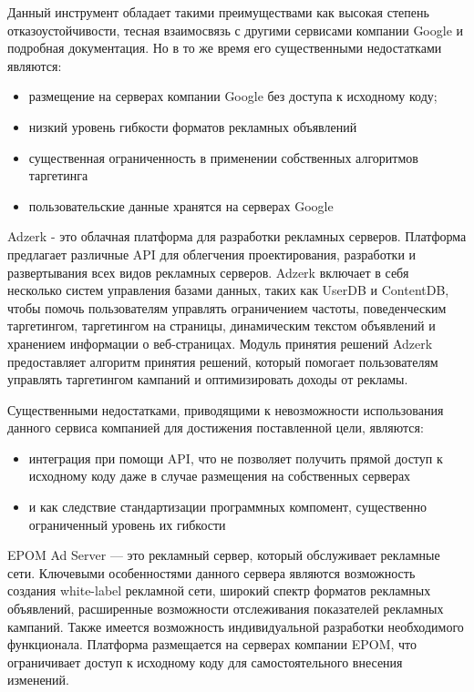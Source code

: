 \documentclass[times]{itmo-student-thesis}
\begin{document}
Данный инструмент обладает такими преимуществами как высокая степень отказоустойчивости, тесная взаимосвязь с другими сервисами компании Google и подробная документация. Но в то же время его существенными недостатками являются:
\begin{itemize}
\item размещение на серверах компании Google без доступа к исходному коду;
\item низкий уровень гибкости форматов рекламных объявлений
\item существенная ограниченность в применении собственных алгоритмов таргетинга
\item пользовательские данные хранятся на серверах Google
\end{itemize}


Adzerk\cite{adzerk} - это облачная платформа для разработки рекламных серверов. Платформа предлагает различные API для облегчения проектирования, разработки и развертывания всех видов рекламных серверов. Adzerk включает в себя несколько систем управления базами данных, таких как UserDB и ContentDB, чтобы помочь пользователям управлять ограничением частоты, поведенческим таргетингом, таргетингом на страницы, динамическим текстом объявлений и хранением информации о веб-страницах. Модуль принятия решений Adzerk предоставляет алгоритм принятия решений, который помогает пользователям управлять таргетингом кампаний и оптимизировать доходы от рекламы. 

Существенными недостатками, приводящими к невозможности использования данного сервиса компанией для достижения поставленной цели, являются:
\begin{itemize}
\item интеграция при помощи API, что не позволяет получить прямой доступ к исходному коду даже в случае размещения на собственных серверах
\item и как следствие стандартизации программных компомент, существенно ограниченный уровень их гибкости 
\end{itemize}

EPOM Ad Server \cite{epom-ad-server} — это рекламный сервер, который обслуживает рекламные сети. Ключевыми особенностями данного сервера являются возможность создания white-label рекламной сети, широкий спектр форматов рекламных объявлений, расширенные возможности отслеживания показателей рекламных кампаний. Также имеется возможность индивидуальной разработки необходимого функционала. Платформа размещается на серверах компании EPOM, что ограничивает доступ к исходному коду для самостоятельного внесения изменений.
\end{document}
